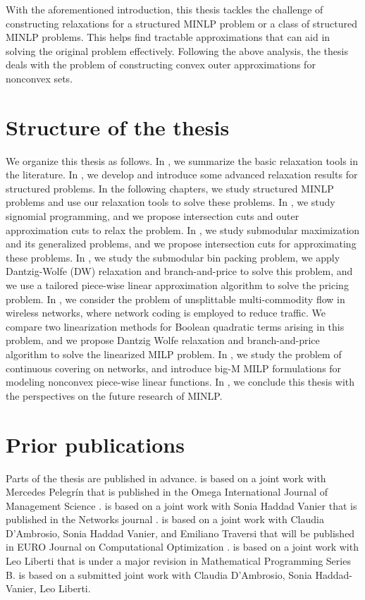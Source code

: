 With the aforementioned introduction, this thesis tackles the challenge of constructing relaxations for a structured MINLP problem or a class of structured MINLP problems. This helps find tractable approximations that can aid in solving the original problem effectively. Following the above analysis, the thesis deals with the problem of constructing convex outer approximations for nonconvex sets. 

\section{Structure of the thesis}
We organize this thesis as follows. In , we summarize the basic relaxation tools in the literature. In ,  we develop and introduce some advanced relaxation results for structured problems. In the following chapters, we study structured MINLP problems and use our relaxation tools to solve these problems. In , we study signomial programming, and we propose intersection cuts and outer approximation cuts to relax the problem.  In , we study submodular maximization and its generalized problems, and we propose intersection cuts for approximating these problems.  In ,  we study the submodular bin packing problem, we apply Dantzig-Wolfe (DW) relaxation and branch-and-price to solve this problem, and we use a tailored piece-wise linear approximation algorithm to solve the pricing problem. In , we consider the problem of unsplittable multi-commodity flow in wireless networks, where network coding is employed to reduce traffic. We compare two linearization methods for Boolean quadratic terms arising in this problem, and we propose Dantzig Wolfe relaxation and branch-and-price algorithm to solve the linearized MILP problem. In , we study the problem of continuous covering on networks, and introduce big-M MILP formulations for modeling nonconvex piece-wise linear functions.  In , we conclude this thesis with the perspectives on the future research of MINLP.
  
\section{Prior publications} 

Parts of the thesis are published in advance.  is based on a joint work with Mercedes Pelegrín that is published in the Omega International Journal of Management Science \cite{PELEGRIN2023102835}.   is based on a joint work with Sonia Haddad Vanier that is published in the Networks journal \cite{xu2022branch}.   is based on a joint  work with Claudia D'Ambrosio, Sonia Haddad Vanier, and Emiliano Traversi that will be published in EURO Journal on Computational Optimization \cite{xu2022branch}.  is based on a joint work with Leo Liberti that is  under a major revision in Mathematical Programming Series B.  is based on a submitted joint work with Claudia D'Ambrosio, Sonia Haddad-Vanier, Leo Liberti.

